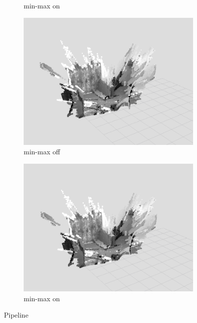 \documentclass[12pt,titlepage, a4paper]{article}
\begin{document}
\begin{figure}[h!]
\begin{subfigure}[h]{0.45\textwidth}
		\caption{min-max on}
	\end{subfigure}
	\begin{subfigure}[h]{0.45\textwidth}
		\includegraphics[width=\textwidth]{./jumpEdge/je_off_pointcloud.png}
		\caption{min-max off}
	\end{subfigure}
	\begin{subfigure}[h]{0.45\textwidth}
		\includegraphics[width=\textwidth]{./jumpEdge/je_on_pointcloud.png}
		\caption{min-max on}
	\end{subfigure}	
 \caption{Pipeline}
\end{figure}
\end{document}
